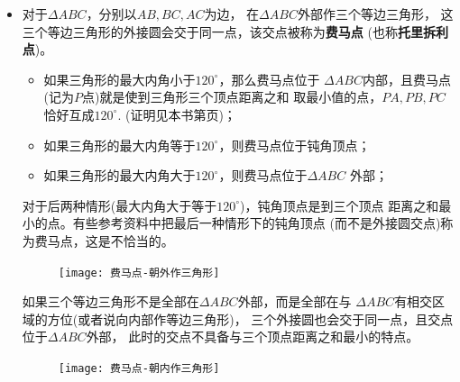 \begin{itemize}[leftmargin=\inteval{\myitemleftmargin}pt,itemsep=
   \inteval{\myitemitempsep}pt,topsep=\inteval{\myitemtopsep}pt]
\item 对于$ \Delta ABC $，分别以$ AB,BC,AC $为边，
在$ \Delta ABC $外部作三个等边三角形，
这三个等边三角形的外接圆会交于同一点，该交点被称为\textbf{费马点}
(也称\textbf{托里拆利点})。
\begin{itemize}[itemsep=-3pt]
\item 如果三角形的最大内角小于$ 120^{\circ} $，那么费马点位于
$ \Delta ABC $内部，且费马点(记为$ P $点)就是使到三角形三个顶点距离之和
取最小值的点，$ PA,PB,PC $恰好互成$ 120^{\circ} $.
(证明见本书第\pageref{费马点求偏导}页)；
\item 如果三角形的最大内角等于$ 120^{\circ} $，则费马点位于钝角顶点；
\item 如果三角形的最大内角大于$ 120^{\circ} $，则费马点位于$ \Delta ABC $
外部；
\end{itemize}
对于后两种情形(最大内角大于等于$ 120^{\circ} $)，钝角顶点是到三个顶点
距离之和最小的点。有些参考资料中把最后一种情形下的钝角顶点
(而不是外接圆交点)称为费马点，这是不恰当的。
\begin{figure}[!h]
    \centering
    \texttt{[image: 费马点-朝外作三角形]}
    \label{费马点朝内朝外两种}
\end{figure}

如果三个等边三角形不是全部在$ \Delta ABC $外部，而是全部在与
$ \Delta ABC $有相交区域的方位(或者说向内部作等边三角形)，
三个外接圆也会交于同一点，且交点位于$ \Delta ABC $外部，
此时的交点不具备与三个顶点距离之和最小的特点。
\begin{figure}[!h]
    \centering
    \texttt{[image: 费马点-朝内作三角形]}
\end{figure}
\newpage

\end{itemize}

